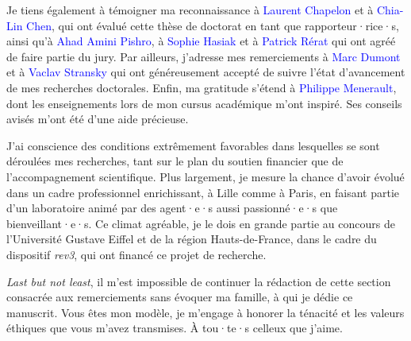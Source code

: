 Je tiens également à témoigner ma reconnaissance à \textcolor{blue}{Laurent Chapelon} et à \textcolor{blue}{Chia-Lin Chen}, qui ont évalué cette thèse de doctorat en tant que rapporteur·rice·s, ainsi qu'à \textcolor{blue}{Ahad Amini Pishro}, à \textcolor{blue}{Sophie Hasiak} et à \textcolor{blue}{Patrick Rérat} qui ont agréé de faire partie du jury. Par ailleurs, j'adresse mes remerciements à \textcolor{blue}{Marc Dumont} et à \textcolor{blue}{Vaclav Stransky} qui ont généreusement accepté de suivre l'état d'avancement de mes recherches doctorales. Enfin, ma gratitude s'étend à \textcolor{blue}{Philippe Menerault}, dont les enseignements lors de mon cursus académique m'ont inspiré. Ses conseils avisés m'ont été d'une aide précieuse.%

J'ai conscience des conditions extrêmement favorables dans lesquelles se sont déroulées mes recherches, tant sur le plan du soutien financier que de l'accompagnement scientifique. Plus largement, je mesure la chance d'avoir évolué dans un cadre professionnel enrichissant, à Lille comme à Paris, en faisant partie d'un laboratoire animé par des agent·e·s aussi passionné·e·s que bienveillant·e·s. Ce climat agréable, je le dois en grande partie au concours de l'Université Gustave Eiffel et de la région Hauts-de-France, dans le cadre du dispositif \textsl{rev3}, qui ont financé ce projet de recherche.%

\textsl{Last but not least}, il m'est impossible de continuer la rédaction de cette section consacrée aux remerciements sans évoquer ma famille, à qui je dédie ce manuscrit. Vous êtes mon modèle, je m'engage à honorer la ténacité et les valeurs éthiques que vous m'avez transmises. À tou·te·s celleux que j'aime.%

